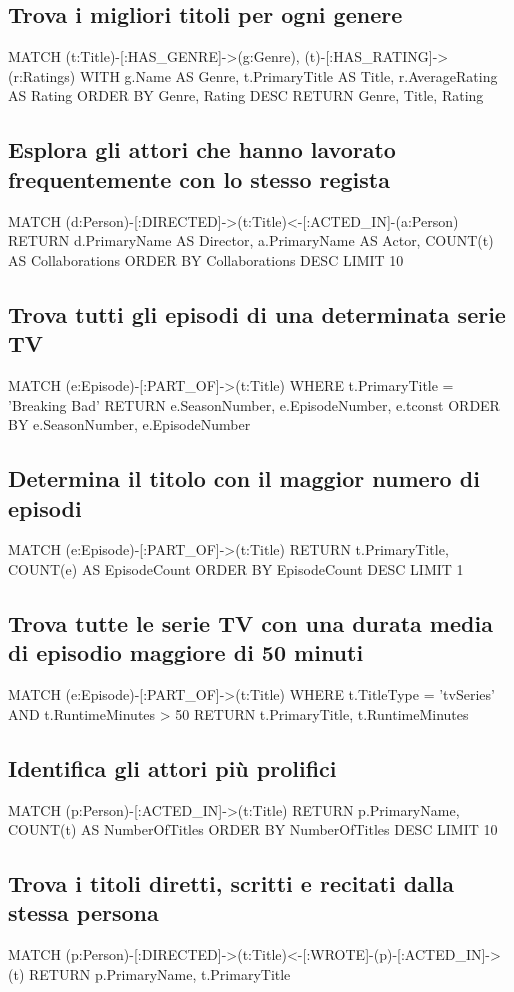 \documentclass[a4paper,12pt]{article}
\begin{document}
\subsection{Trova i migliori titoli per ogni genere}
MATCH (t:Title)-[:HAS_GENRE]->(g:Genre), (t)-[:HAS_RATING]->(r:Ratings)
WITH g.Name AS Genre, t.PrimaryTitle AS Title, r.AverageRating AS Rating
ORDER BY Genre, Rating DESC
RETURN Genre, Title, Rating

\subsection{Esplora gli attori che hanno lavorato frequentemente con lo stesso regista}
MATCH (d:Person)-[:DIRECTED]->(t:Title)<-[:ACTED_IN]-(a:Person)
RETURN d.PrimaryName AS Director, a.PrimaryName AS Actor, COUNT(t) AS Collaborations
ORDER BY Collaborations DESC
LIMIT 10

\subsection{Trova tutti gli episodi di una determinata serie TV}
MATCH (e:Episode)-[:PART_OF]->(t:Title)
WHERE t.PrimaryTitle = 'Breaking Bad'
RETURN e.SeasonNumber, e.EpisodeNumber, e.tconst
ORDER BY e.SeasonNumber, e.EpisodeNumber

\subsection{Determina il titolo con il maggior numero di episodi}
MATCH (e:Episode)-[:PART_OF]->(t:Title)
RETURN t.PrimaryTitle, COUNT(e) AS EpisodeCount
ORDER BY EpisodeCount DESC
LIMIT 1

\subsection{Trova tutte le serie TV con una durata media di episodio maggiore di 50 minuti}
MATCH (e:Episode)-[:PART_OF]->(t:Title)
WHERE t.TitleType = 'tvSeries' AND t.RuntimeMinutes > 50
RETURN t.PrimaryTitle, t.RuntimeMinutes

\subsection{Identifica gli attori più prolifici}
MATCH (p:Person)-[:ACTED_IN]->(t:Title)
RETURN p.PrimaryName, COUNT(t) AS NumberOfTitles
ORDER BY NumberOfTitles DESC
LIMIT 10

\subsection{Trova i titoli diretti, scritti e recitati dalla stessa persona}
MATCH (p:Person)-[:DIRECTED]->(t:Title)<-[:WROTE]-(p)-[:ACTED_IN]->(t)
RETURN p.PrimaryName, t.PrimaryTitle
\end{document}
